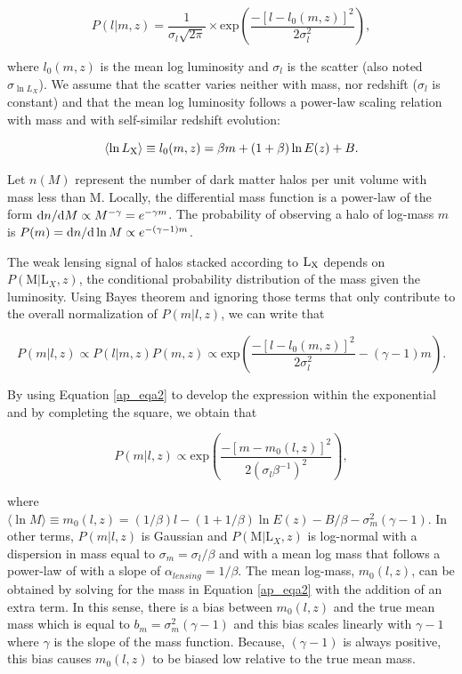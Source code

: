 \documentclass[12pt]{emulateapj}
\newcommand{\lx}{$\rm{L}_{\rm X}$ }
\begin{document}
\begin{equation}\label{ap_eqa1}
  P(l|m,z) = \frac{1}{\sigma_{l}\sqrt{2\pi}} \times \mathrm{exp} \left( \frac{-[l-l_0(m,z)]^2}{2\sigma_l^2} \right),
\end{equation}

\noindent where $l_0(m,z)$ is the mean log luminosity and $\sigma_l$
is the scatter (also noted $\sigma_{\ln L_{X}}$). We assume that the
scatter varies neither with mass, nor redshift ($\sigma_{l}$ is
constant) and that the mean log luminosity follows a power-law scaling
relation with mass and with self-similar redshift evolution:

\begin{equation}\label{ap_eqa2}
  \langle \ln L_{\rm X}\rangle  \equiv l_{0}(m,z) = \beta m + (1+\beta)\ln E(z) + B.
\end{equation}

Let $n(M)$ represent the number of dark matter halos per unit volume
with mass less than M. Locally, the differential mass function is a
power-law of the form ${\rm d}n/{\rm d}M \propto
M^{-\gamma}=e^{-\gamma m}$. The probability of observing a halo of
log-mass $m$ is $P(m)={\rm d}n/{\rm d}\ln M \propto e^{-(\gamma-1) m}$.

The weak lensing signal of halos stacked according to \lx depends on
$P(\mathrm{M}|\mathrm{L}_X,z)$, the conditional probability
distribution of the mass given the luminosity. Using Bayes theorem and
ignoring those terms that only contribute to the overall normalization
of $P(m|l,z)$, we can write that

\begin{equation}\label{ap_eqa3}
  P(m|l,z) \propto P(l|m,z) P(m,z)
  \propto \mathrm{exp} \left( \frac{-[l-l_0(m,z)]^2}{2\sigma_l^2} -(\gamma-1) m \right).
\end{equation}

By using Equation \ref{ap_eqa2} to develop the expression within the
exponential and by completing the square, we obtain that

\begin{equation}
  P(m|l,z) \propto \mathrm{exp} \left( \frac{-[m-m_0(l,z)]^2}{2(\sigma_l \beta^{-1})^2} \right),
\end{equation}

\noindent where $ \langle \ln M\rangle \equiv m_{0}(l,z)=(1/\beta)
l-(1+1/\beta)\ln E(z)- B/\beta -\sigma_{m}^2(\gamma-1)$. In other
terms, $P(m|l,z)$ is Gaussian and $P(\mathrm{M}|\mathrm{L}_X,z)$ is
log-normal with a dispersion in mass equal to
$\sigma_{m}=\sigma_{l}/\beta$ and with a mean log mass that follows a
power-law of with a slope of $\alpha_{lensing}=1/\beta$. The mean
log-mass, $m_{0}(l,z)$, can be obtained by solving for the mass in
Equation \ref{ap_eqa2} with the addition of an extra term. In this
sense, there is a bias between $m_{0}(l,z)$ and the true mean mass
which is equal to $b_{m}=\sigma_{m}^2(\gamma-1)$ and this bias scales
linearly with $\gamma-1$ where $\gamma$ is the slope of the mass
function. Because, $(\gamma-1)$ is always positive, this bias causes
$m_{0}(l,z)$ to be biased low relative to the true mean mass.
\end{document}
